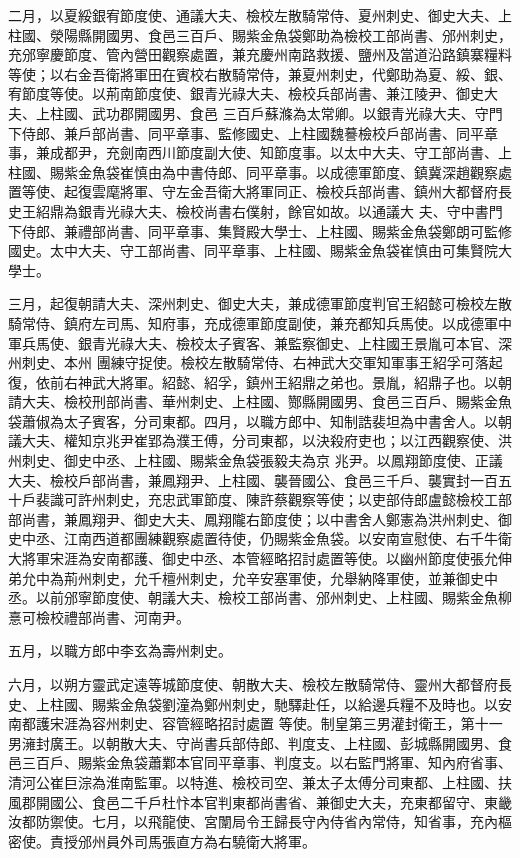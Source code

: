 \begin{pinyinscope}
 二月，以夏綏銀宥節度使、通議大夫、檢校左散騎常侍、夏州刺史、御史大夫、上柱國、滎陽縣開國男、食邑三百戶、賜紫金魚袋鄭助為檢校工部尚書、邠州刺史，充邠寧慶節度、管內營田觀察處置，兼充慶州南路救援、鹽州及當道沿路鎮寨糧料等使；以右金吾衛將軍田在賓校右散騎常侍，兼夏州刺史，代鄭助為夏、綏、銀、宥節度等使。以荊南節度使、銀青光祿大夫、檢校兵部尚書、兼江陵尹、御史大夫、上柱國、武功郡開國男、食邑
 三百戶蘇滌為太常卿。以銀青光祿大夫、守門下侍郎、兼戶部尚書、同平章事、監修國史、上柱國魏謩檢校戶部尚書、同平章事，兼成都尹，充劍南西川節度副大使、知節度事。以太中大夫、守工部尚書、上柱國、賜紫金魚袋崔慎由為中書侍郎、同平章事。以成德軍節度、鎮冀深趙觀察處置等使、起復雲麾將軍、守左金吾衛大將軍同正、檢校兵部尚書、鎮州大都督府長史王紹鼎為銀青光祿大夫、檢校尚書右僕射，餘官如故。以通議大
 夫、守中書門下侍郎、兼禮部尚書、同平章事、集賢殿大學士、上柱國、賜紫金魚袋鄭朗可監修國史。太中大夫、守工部尚書、同平章事、上柱國、賜紫金魚袋崔慎由可集賢院大學士。



 三月，起復朝請大夫、深州刺史、御史大夫，兼成德軍節度判官王紹懿可檢校左散騎常侍、鎮府左司馬、知府事，充成德軍節度副使，兼充都知兵馬使。以成德軍中軍兵馬使、銀青光祿大夫、檢校太子賓客、兼監察御史、上柱國王景胤可本官、深州刺史、本州
 團練守捉使。檢校左散騎常侍、右神武大交軍知軍事王紹孚可落起復，依前右神武大將軍。紹懿、紹孚，鎮州王紹鼎之弟也。景胤，紹鼎子也。以朝請大夫、檢校刑部尚書、華州刺史、上柱國、酂縣開國男、食邑三百戶、賜紫金魚袋蕭俶為太子賓客，分司東都。四月，以職方郎中、知制誥裴坦為中書舍人。以朝議大夫、權知京兆尹崔郢為濮王傅，分司東都，以決殺府吏也；以江西觀察使、洪州刺史、御史中丞、上柱國、賜紫金魚袋張毅夫為京
 兆尹。以鳳翔節度使、正議大夫、檢校戶部尚書，兼鳳翔尹、上柱國、襲晉國公、食邑三千戶、襲實封一百五十戶裴識可許州刺史，充忠武軍節度、陳許蔡觀察等使；以吏部侍郎盧懿檢校工部部尚書，兼鳳翔尹、御史大夫、鳳翔隴右節度使；以中書舍人鄭憲為洪州刺史、御史中丞、江南西道都團練觀察處置待使，仍賜紫金魚袋。以安南宣慰使、右千牛衛大將軍宋涯為安南都護、御史中丞、本管經略招討處置等使。以幽州節度使張允伸
 弟允中為荊州刺史，允千檀州刺史，允辛安塞軍使，允舉納降軍使，並兼御史中丞。以前邠寧節度使、朝議大夫、檢校工部尚書、邠州刺史、上柱國、賜紫金魚柳憙可檢校禮部尚書、河南尹。



 五月，以職方郎中李玄為壽州刺史。



 六月，以朔方靈武定遠等城節度使、朝散大夫、檢校左散騎常侍、靈州大都督府長史、上柱國、賜紫金魚袋劉潼為鄭州刺史，馳驛赴任，以給邊兵糧不及時也。以安南都護宋涯為容州刺史、容管經略招討處置
 等使。制皇第三男灌封衛王，第十一男澭封廣王。以朝散大夫、守尚書兵部侍郎、判度支、上柱國、彭城縣開國男、食邑三百戶、賜紫金魚袋蕭鄴本官同平章事、判度支。以右監門將軍、知內府省事、清河公崔巨淙為淮南監軍。以特進、檢校司空、兼太子太傅分司東都、上柱國、扶風郡開國公、食邑二千戶杜忭本官判東都尚書省、兼御史大夫，充東都留守、東畿汝都防禦使。七月，以飛龍使、宮闈局令王歸長守內侍省內常侍，知省事，充內樞
 密使。責授邠州員外司馬張直方為右驍衛大將軍。




\end{pinyinscope}
